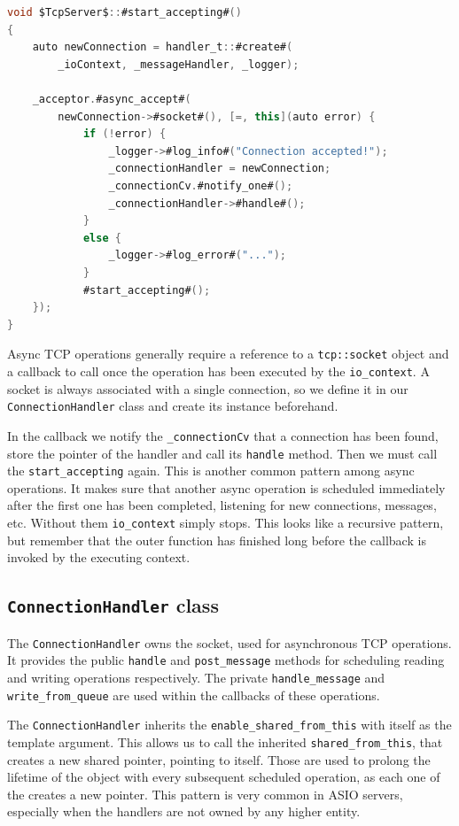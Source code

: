 \begin{lstlisting}[language=csharp, caption={\texttt{start\_accepting} method}]
void $TcpServer$::#start_accepting#()
{
    auto newConnection = handler_t::#create#(
        _ioContext, _messageHandler, _logger);

    _acceptor.#async_accept#(
        newConnection->#socket#(), [=, this](auto error) {
            if (!error) {
                _logger->#log_info#("Connection accepted!");
                _connectionHandler = newConnection;
                _connectionCv.#notify_one#();
                _connectionHandler->#handle#();
            }
            else {
                _logger->#log_error#("...");
            }
            #start_accepting#();
    });
}
\end{lstlisting}

Async TCP operations generally require a reference to a \texttt{tcp::socket} object and a callback to call once the operation has been executed by the \texttt{io\_context}. A socket is always associated with a single connection, so we define it in our \texttt{ConnectionHandler} class and create its instance beforehand.

In the callback we notify the \texttt{\_connectionCv} that a connection has been found, store the pointer of the handler and call its \texttt{handle} method. Then we must call the \texttt{start\_accepting} again. This is another common pattern among async operations. It makes sure that another async operation is scheduled immediately after the first one has been completed, listening for new connections, messages, etc. Without them \texttt{io\_context} simply stops. This looks like a recursive pattern, but remember that the outer function has finished long before the callback is invoked by the executing context.

\subsection{\texttt{ConnectionHandler} class}

The \texttt{ConnectionHandler} owns the socket, used for asynchronous TCP operations. It provides the public \texttt{handle} and \texttt{post\_message} methods for scheduling reading and writing operations respectively. The private \texttt{handle\_message} and \texttt{write\_from\_queue} are used within the callbacks of these operations.

The \texttt{ConnectionHandler} inherits the \texttt{enable\_shared\_from\_this} with itself as the template argument. This allows us to call the inherited \texttt{shared\_from\_this}, that creates a new shared pointer, pointing to itself. Those are used to prolong the lifetime of the object with every subsequent scheduled operation, as each one of the creates a new pointer. This pattern is very common in ASIO servers, especially when the handlers are not owned by any higher entity.

